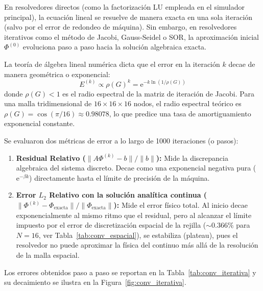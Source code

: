 \documentclass[11pt]{article}
\begin{document}
En resolvedores directos (como la factorización LU empleada en el simulador principal), la ecuación lineal se resuelve de manera exacta en una sola iteración (salvo por el error de redondeo de máquina). Sin embargo, en resolvedores iterativos como el método de Jacobi, Gauss-Seidel o SOR, la aproximación inicial $\Phi^{(0)}$ evoluciona paso a paso hacia la solución algebraica exacta.

La teoría de álgebra lineal numérica dicta que el error en la iteración $k$ decae de manera geométrica o exponencial:
\begin{equation}
  E^{(k)} \propto \rho(G)^k = \mathrm{e}^{-k \ln(1/\rho(G))}
\end{equation}
donde $\rho(G) < 1$ es el radio espectral de la matriz de iteración de Jacobi. Para una malla tridimensional de $16 \times 16 \times 16$ nodos, el radio espectral teórico es $\rho(G) = \cos(\pi/16) \approx 0.98078$, lo que predice una tasa de amortiguamiento exponencial constante.

Se evaluaron dos métricas de error a lo largo de 1000 iteraciones (o pasos):
\begin{enumerate}
  \item \textbf{Residual Relativo ($\|A\Phi^{(k)} - b\| / \|b\|$):} Mide la discrepancia algebraica del sistema discreto. Decae como una exponencial negativa pura ($\mathrm{e}^{-\beta k}$) directamente hasta el límite de precisión de la máquina.
  \item \textbf{Error $L_2$ Relativo con la solución analítica continua ($\|\Phi^{(k)} - \Phi_{\text{exacta}}\| / \|\Phi_{\text{exacta}}\|$):} Mide el error físico total. Al inicio decae exponencialmente al mismo ritmo que el residual, pero al alcanzar el límite impuesto por el error de discretización espacial de la rejilla ($\sim 0.366\%$ para $N=16$, ver Tabla~\ref{tab:conv_espacial}), se estabiliza (plateau), pues el resolvedor no puede aproximar la física del continuo más allá de la resolución de la malla espacial.
\end{enumerate}

Los errores obtenidos paso a paso se reportan en la Tabla~\ref{tab:conv_iterativa} y su decaimiento se ilustra en la Figura~\ref{fig:conv_iterativa}.
\end{document}

